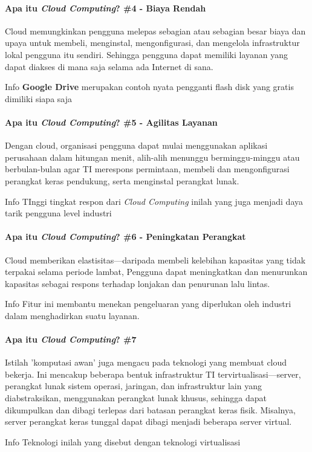 \begin{frame}{\insertsectionhead}
	\framesubtitle{Apa itu \textit{Cloud Computing}? \#4 - Biaya Rendah}
	\justifying
	Cloud memungkinkan pengguna melepas sebagian atau sebagian besar biaya dan upaya untuk membeli, menginstal, mengonfigurasi, dan mengelola infrastruktur lokal pengguna itu sendiri.
	\vfill
	Sehingga pengguna dapat memiliki layanan yang dapat diakses di mana saja selama ada Internet di sana.
	\vfill
	\begin{block}{Info}
		\textbf{Google Drive} merupakan contoh nyata pengganti flash disk yang gratis dimiliki siapa saja
	\end{block}
\end{frame}

\begin{frame}{\insertsectionhead}
	\framesubtitle{Apa itu \textit{Cloud Computing}? \#5 - Agilitas Layanan}
	\justifying
	Dengan cloud, organisasi pengguna dapat mulai menggunakan aplikasi perusahaan dalam hitungan menit, alih-alih menunggu berminggu-minggu atau berbulan-bulan agar TI merespons permintaan, membeli dan mengonfigurasi perangkat keras pendukung, serta menginstal perangkat lunak.
	\vfill
	\begin{block}{Info}
		TInggi tingkat respon dari \textit{Cloud Computing} inilah yang juga menjadi daya tarik pengguna level industri
	\end{block}
\end{frame}

\begin{frame}{\insertsectionhead}
	\framesubtitle{Apa itu \textit{Cloud Computing}? \#6 - Peningkatan Perangkat}
	\justifying
	Cloud memberikan elastisitas—daripada membeli kelebihan kapasitas yang tidak terpakai selama periode lambat, Pengguna dapat meningkatkan dan menurunkan kapasitas sebagai respons terhadap lonjakan dan penurunan lalu lintas.
	\vfill
	\begin{block}{Info}
		Fitur ini membantu menekan pengeluaran yang diperlukan oleh industri dalam menghadirkan suatu layanan.
	\end{block}
\end{frame}

\begin{frame}{\insertsectionhead}
	\framesubtitle{Apa itu \textit{Cloud Computing}? \#7}
	\justifying
	Istilah 'komputasi awan' juga mengacu pada teknologi yang membuat cloud bekerja. Ini mencakup beberapa bentuk infrastruktur TI tervirtualisasi—server, perangkat lunak sistem operasi, jaringan, dan infrastruktur lain yang diabstraksikan, menggunakan perangkat lunak khusus, sehingga dapat dikumpulkan dan dibagi terlepas dari batasan perangkat keras fisik.
	\vfill
	Misalnya, server perangkat keras tunggal dapat dibagi menjadi beberapa server virtual.
	\vfill
	\begin{block}{Info}
		Teknologi inilah yang disebut dengan teknologi virtualisasi
	\end{block}
\end{frame}

